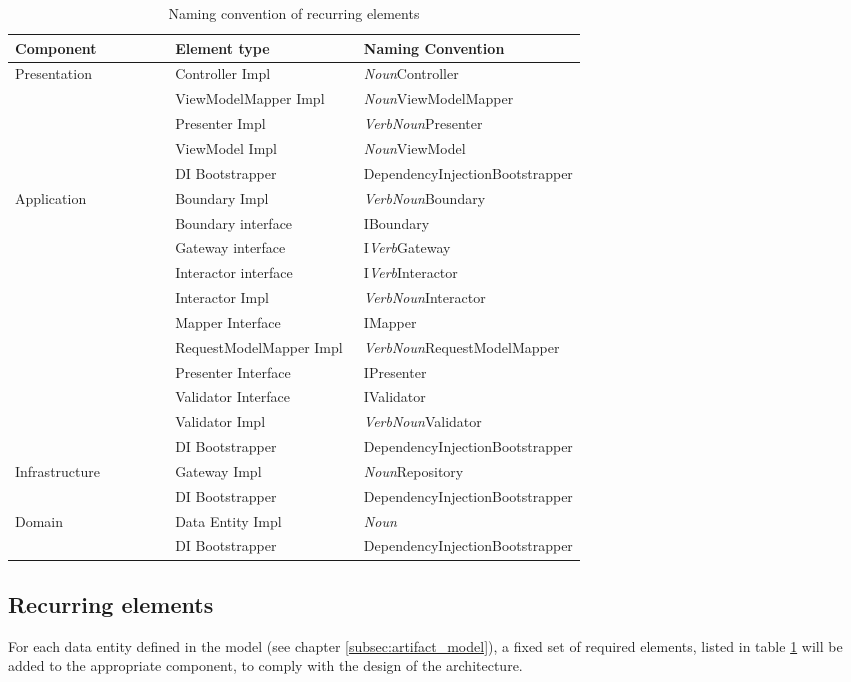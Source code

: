     \begin{table}[h]
        \small
        \begin{tabular}{ l p{0.33\linewidth} p{0.39\linewidth} }
        \hline
        \textbf{Component} & \textbf{Element type} & \textbf{Naming Convention} \\ \hline
        Presentation & Controller Impl & \textit{Noun}Controller \\
        & ViewModelMapper Impl & \textit{Noun}ViewModelMapper \\
        & Presenter Impl & \textit{VerbNoun}Presenter \\
        & ViewModel Impl & \textit{Noun}ViewModel \\
        & DI Bootstrapper & DependencyInjectionBootstrapper \\ \hline

        Application & Boundary Impl & \textit{VerbNoun}Boundary \\
        & Boundary interface & IBoundary \\
        & Gateway interface & I\textit{Verb}Gateway \\
        & Interactor interface & I\textit{Verb}Interactor \\
        & Interactor Impl & \textit{VerbNoun}Interactor \\
        & Mapper Interface & IMapper \\
        & RequestModelMapper Impl & \textit{VerbNoun}RequestModelMapper \\
        & Presenter Interface & IPresenter \\
        & Validator Interface & IValidator \\
        & Validator Impl & \textit{VerbNoun}Validator \\
        & DI Bootstrapper & DependencyInjectionBootstrapper \\ \hline
        
        Infrastructure & Gateway Impl & \textit{Noun}Repository \\
        & DI Bootstrapper & DependencyInjectionBootstrapper \\ \hline

        Domain & Data Entity Impl & \textit{Noun} \\
        & DI Bootstrapper & DependencyInjectionBootstrapper \\ \hline
        \end{tabular}
        \caption{Naming convention of recurring elements}
        \label{table:element_naming_convention}
        \end{table}

    \subsection{Recurring elements}
    
    For each data entity defined in the model (see chapter \ref{subsec:artifact_model}), a
    fixed set of required elements, listed in table \ref{table:element_naming_convention}
    will be added to the appropriate component, to comply with the design of the
    architecture.

